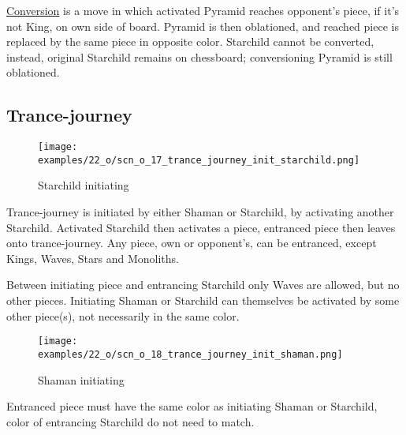 \hyperref[sec:Mayan Ascendancy/Pyramid/Conversion]{Conversion} is a move in which activated
Pyramid reaches opponent's piece, if it's not King, on own side of board. Pyramid is then
oblationed, and reached piece is replaced by the same piece in opposite color.
Starchild cannot be converted, instead, original Starchild remains on chessboard;
conversioning Pyramid is still oblationed.

\clearpage %

\subsection*{Trance-journey}

\vspace*{-1.1\baselineskip}
\noindent
\begin{wrapfigure}[11]{l}{0.4\textwidth}
\centering
\texttt{[image: examples/22\_o/scn\_o\_17\_trance\_journey\_init\_starchild.png]}
\caption{Starchild initiating}
\label{fig:scn_o_17_trance_journey_init_starchild}
\end{wrapfigure}
Trance-journey is initiated by either Shaman or Starchild, by activating another Starchild.
Activated Starchild then activates a piece, entranced piece then leaves onto trance-journey.
Any piece, own or opponent's, can be entranced, except Kings, Waves, Stars and Monoliths.

Between initiating piece and entrancing Starchild only Waves are allowed, but no other pieces.
Initiating Shaman or Starchild can themselves be activated by some other piece(s), not necessarily
in the same color.

\vspace*{-0.3\baselineskip}
\noindent
\begin{wrapfigure}[10]{l}{0.4\textwidth}
\centering
\texttt{[image: examples/22\_o/scn\_o\_18\_trance\_journey\_init\_shaman.png]}
\caption{Shaman initiating}
\label{fig:scn_o_18_trance_journey_init_shaman}
\end{wrapfigure}
Entranced piece must have the same color as initiating Shaman or Starchild, color of
entrancing Starchild do not need to match.


